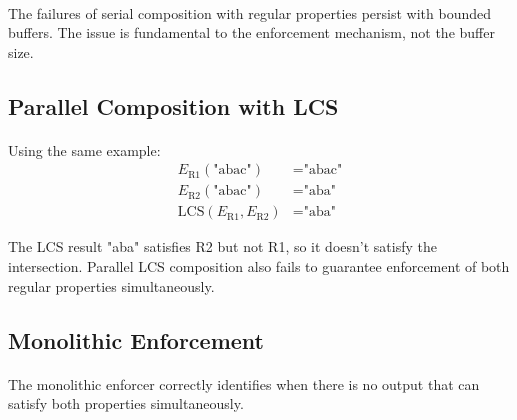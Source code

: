 \paragraph{}
The failures of serial composition with regular properties persist with bounded buffers. The issue is fundamental to the enforcement mechanism, not the buffer size.

\subsection{Parallel Composition with LCS}

\paragraph{}
Using the same example:
\begin{align*}
    E_{\text{R1}}(\text{"abac"}) &= \text{"abac"} \\
    E_{\text{R2}}(\text{"abac"}) &= \text{"aba"} \\
    \text{LCS}(E_{\text{R1}}, E_{\text{R2}}) &= \text{"aba"}
\end{align*}

The LCS result "aba" satisfies R2 but not R1, so it doesn't satisfy the intersection. Parallel LCS composition also fails to guarantee enforcement of both regular properties simultaneously.

\subsection{Monolithic Enforcement}

\paragraph{}
The monolithic enforcer correctly identifies when there is no output that can satisfy both properties simultaneously.



